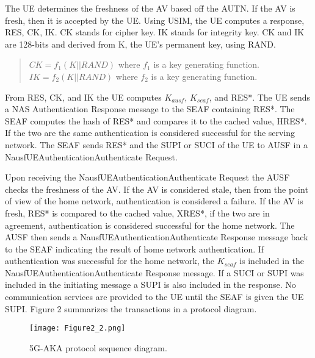 \documentclass[10pt, pdftex]{article}
\begin{document}
The UE determines the freshness of the AV based off the AUTN. If the AV is fresh, then it is accepted by the UE. Using USIM, the UE computes a response, RES, CK, IK. CK stands for cipher key. IK stands for integrity key. CK and IK are 128-bits and derived from K, the UE's permanent key, using RAND. 
\begin{quote}
	$CK = f_1(K||RAND) $ where $ f_1 $ is a key generating function.
	\newline
	$IK = f_2(K||RAND) $ where $ f_2 $ is a key generating function.
\end{quote} 
From RES, CK, and IK the UE computes $K_{ausf}$, $K_{seaf}$, and RES*. The UE sends a NAS Authentication Response message to the SEAF containing RES*. The SEAF computes the hash of RES* and compares it to the cached value, HRES*. If the two are the same authentication is considered successful for the serving network. The SEAF sends RES* and the SUPI or SUCI of the UE to AUSF in a Nausf\textunderscore UEAuthentication\textunderscore Authenticate Request. 

Upon receiving the Nausf\textunderscore UEAuthentication\textunderscore Authenticate Request the AUSF checks the freshness of the AV. If the AV is considered stale, then from the point of view of the home network, authentication is considered a failure. If the AV is fresh, RES* is compared to the cached value, XRES*, if the two are in agreement, authentication is considered successful for the home network. The AUSF then sends a Nausf\textunderscore UEAuthentication\textunderscore Authenticate Response message back to the SEAF indicating the result of home network authentication. If authentication was successful for the home network, the $K_{seaf}$ is included in the Nausf\textunderscore UEAuthentication\textunderscore Authenticate Response message. If a SUCI or SUPI was included in the initiating message a SUPI is also included in the response. No communication services are provided to the UE until the SEAF is given the UE SUPI. Figure 2 summarizes the transactions in a protocol diagram.

\begin{figure}[h]
	\begin{center}
		\texttt{[image: Figure2\_2.png]}
	\end{center}
	\caption{5G-AKA protocol sequence diagram.}
\end{figure}
\end{document}
